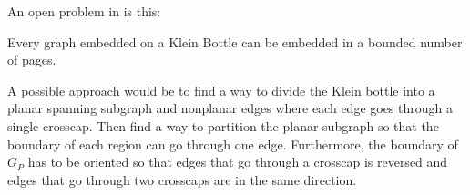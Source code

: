 An open problem in \textcite{ozekiBookEmbeddingGraphs2019} is this:
\begin{conjecture}
    Every graph embedded on a Klein Bottle can be embedded in a bounded number of pages.
\end{conjecture}

A possible approach would be to find a way to divide the Klein bottle into a planar spanning subgraph and nonplanar edges where each edge goes through a single crosscap. Then find a way to partition the planar subgraph so that the boundary of each region can go through one edge. Furthermore, the boundary of $G_P$ has to be oriented so that edges that go through a crosscap is reversed and edges that go through two crosscaps are in the same direction. 